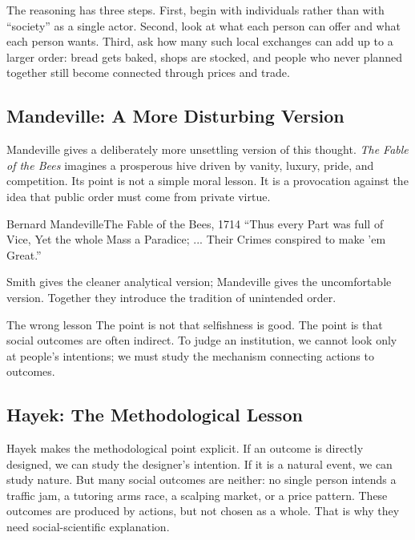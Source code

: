 \documentclass[10pt,a4paper]{article}
\begin{document}
The reasoning has three steps. First, begin with individuals rather than with ``society'' as a single actor. Second, look at what each person can offer and what each person wants. Third, ask how many such local exchanges can add up to a larger order: bread gets baked, shops are stocked, and people who never planned together still become connected through prices and trade.

\subsection{Mandeville: A More Disturbing Version}

Mandeville gives a deliberately more unsettling version of this thought. \textit{The Fable of the Bees} imagines a prosperous hive driven by vanity, luxury, pride, and competition. Its point is not a simple moral lesson. It is a provocation against the idea that public order must come from private virtue.

\begin{quotebox}{Bernard Mandeville}{The Fable of the Bees, 1714}
``Thus every Part was full of Vice, Yet the whole Mass a Paradice; ... Their Crimes conspired to make 'em Great.''
\end{quotebox}

Smith gives the cleaner analytical version; Mandeville gives the uncomfortable version. Together they introduce the tradition of unintended order.

\begin{warningbox}{The wrong lesson}
The point is not that selfishness is good. The point is that social outcomes are often indirect. To judge an institution, we cannot look only at people's intentions; we must study the mechanism connecting actions to outcomes.
\end{warningbox}

\subsection{Hayek: The Methodological Lesson}

Hayek makes the methodological point explicit. If an outcome is directly designed, we can study the designer's intention. If it is a natural event, we can study nature. But many social outcomes are neither: no single person intends a traffic jam, a tutoring arms race, a scalping market, or a price pattern. These outcomes are produced by actions, but not chosen as a whole. That is why they need social-scientific explanation.
\end{document}
